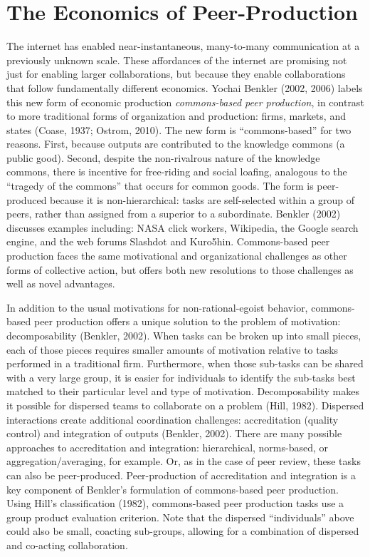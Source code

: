 \section{The Economics of Peer-Production}
The internet has enabled near-instantaneous, many-to-many communication at a previously unknown scale. These affordances of the internet are promising not just for enabling larger collaborations, but because they enable collaborations that follow fundamentally different economics. Yochai Benkler (2002, 2006) labels this new form of economic production {\em commons-based peer production}, in contrast to more traditional forms of organization and production: firms, markets, and states (Coase, 1937; Ostrom, 2010). The new form is ``commons-based'' for two reasons. First, because outputs are contributed to the knowledge commons (a public good). Second, despite the non-rivalrous nature of the knowledge commons, there is incentive for free-riding and social loafing, analogous to the ``tragedy of the commons'' that occurs for common goods. The form is peer-produced because it is non-hierarchical: tasks are self-selected within a group of peers, rather than assigned from a superior to a subordinate. Benkler (2002) discusses examples including: NASA click workers, Wikipedia, the Google search engine, and the web forums Slashdot and Kuro5hin. Commons-based peer production faces the same motivational and organizational challenges as other forms of collective action, but offers both new resolutions to those challenges as well as novel advantages.

In addition to the usual motivations for non-rational-egoist behavior, commons-based peer production offers a unique solution to the problem of motivation: decomposability (Benkler, 2002). When tasks can be broken up into small pieces, each of those pieces requires smaller amounts of motivation relative to tasks performed in a traditional firm. Furthermore, when those sub-tasks can be shared with a very large group, it is easier for individuals to identify the sub-tasks best matched to their particular level and type of motivation. Decomposability makes it possible for dispersed teams to collaborate on a problem (Hill, 1982). Dispersed interactions create additional coordination challenges: accreditation (quality control) and integration of outputs (Benkler, 2002). There are many possible approaches to accreditation and integration: hierarchical, norms-based, or aggregation/averaging, for example. Or, as in the case of peer review, these tasks can also be peer-produced. Peer-production of accreditation and integration is a key component of Benkler's formulation of commons-based peer production. Using Hill's classification (1982), commons-based peer production tasks use a group product evaluation criterion. Note that the dispersed ``individuals'' above could also be small, coacting sub-groups, allowing for a combination of dispersed and co-acting collaboration.


